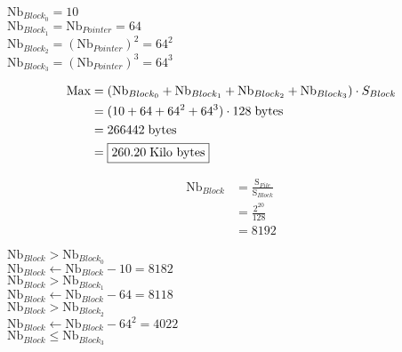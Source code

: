 \vspace{0.25cm}

\begin{center}
\(\boxed{\text{Nb}_{Block_0} = 10}\)\\[0.15cm]
\(\text{Nb}_{Block_1} = \text{Nb}_{Pointer} = \boxed{64}\)\\[0.15cm]
\(\text{Nb}_{Block_2} = (\text{Nb}_{Pointer})^2 = \boxed{64^2}\)\\[0.15cm]
\(\text{Nb}_{Block_3} = (\text{Nb}_{Pointer})^3 = \boxed{64^3}\)\\[0.15cm]
\end{center}

\vspace{0.25cm}

\begin{align*}
    \text{Max}  &= ( \text{Nb}_{Block_0} + \text{Nb}_{Block_1} + \text{Nb}_{Block_2} + \text{Nb}_{Block_3})\cdot 
    S_{Block}\\
                &= (10+64+64^2+64^3)\cdot 128\hspace{0.1cm}\text{bytes}\\
                &=266442 \hspace{0.1cm}\text{bytes}\\
                &=\boxed{260.20\hspace{0.1cm}\text{Kilo bytes}}
\end{align*}

\vspace{0.25cm}

\begin{align*}
    \text{Nb}_{Block} &= \frac{\text{S}_{File}}{\text{S}_{Block}}\\[0.15cm]
                  &= \frac{2^{20}}{128}\\[0.15cm]
                  &=\boxed{8192}
\end{align*}

\newpage
\null

\begin{center}
    \(\text{Nb}_{Block} > \text{Nb}_{Block_0} \)\\[0.15cm]
    \( \text{Nb}_{Block} \gets \text{Nb}_{Block} - 10 = 8182\)\\[0.15cm]
    \(\text{Nb}_{Block} > \text{Nb}_{Block_1} \)\\[0.15cm]
    \( \text{Nb}_{Block} \gets \text{Nb}_{Block} - 64 = 8118\)\\[0.15cm]
    \(\text{Nb}_{Block} > \text{Nb}_{Block_2} \)\\[0.15cm]
    \( \text{Nb}_{Block} \gets \text{Nb}_{Block} - 64^2 = 4022\)\\[0.15cm]
    \(\text{Nb}_{Block} \leq \text{Nb}_{Block_3} \)\\[0.15cm]
\end{center}


